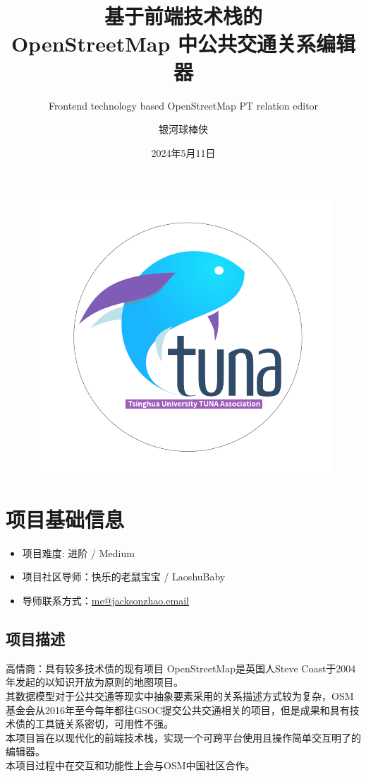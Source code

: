 \documentclass{beamer}
\author{银河球棒侠}
\title{基于前端技术栈的\\ OpenStreetMap 中公共交通关系编辑器}
\subtitle{Frontend technology based OpenStreetMap PT relation editor}
\institute{OSMChina}
\date{2024年5月11日}
\begin{document}
\kaishu
\begin{frame}
    \titlepage
    \begin{figure}[htpb]
        \begin{center}
            \includegraphics[width=0.2\linewidth]{figure/tuna.pdf}
        \end{center}
    \end{figure}
\end{frame}

\begin{frame}
    \tableofcontents[sectionstyle=show,subsectionstyle=show/shaded/hide,subsubsectionstyle=show/shaded/hide]
\end{frame}

\section{项目基础信息}

\begin{frame}
    \begin{itemize}
        \item 项目难度: 进阶 / Medium
        \item 项目社区导师：快乐的老鼠宝宝 / LaoshuBaby
        \item 导师联系方式：\href{mailto:me@jacksonzhao.email}{me@jacksonzhao.email}
    \end{itemize}
\end{frame}

\subsection{项目描述}

\begin{frame}{高情商：具有较多技术债的现有项目}
    \quad \quad OpenStreetMap是英国人Steve Coast于2004年发起的以知识开放为原则的地图项目。\\
    \quad \quad 其数据模型对于公共交通等现实中抽象要素采用的关系描述方式较为复杂，OSM基金会从2016年至今每年都往GSOC提交公共交通相关的项目，但是成果和具有技术债的工具链关系密切，可用性不强。\\
    \quad \quad 本项目旨在以现代化的前端技术栈，实现一个可跨平台使用且操作简单交互明了的编辑器。\\
    \quad \quad 本项目过程中在交互和功能性上会与OSM中国社区合作。
\end{frame}
\end{document}
